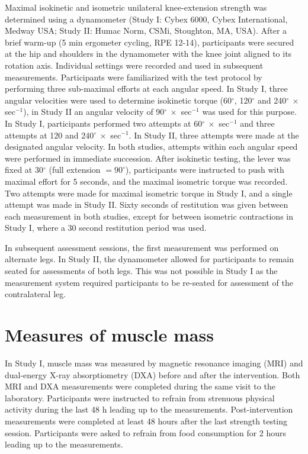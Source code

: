 \documentclass[twoside,10pt]{gihclass} %
\begin{document}
Maximal isokinetic and isometric unilateral knee-extension strength was determined using a dynamometer (Study I: Cybex 6000, Cybex International, Medway USA; Study II: Humac Norm, CSMi, Stoughton, MA, USA).
After a brief warm-up (5 min ergometer cycling, RPE 12-14), participants were secured at the hip and shoulders in the dynamometer with the knee joint aligned to its rotation axis.
Individual settings were recorded and used in subsequent measurements.
Participants were familiarized with the test protocol by performing three sub-maximal efforts at each angular speed.
In Study I, three angular velocities were used to determine isokinetic torque (60\(^{\circ}\), 120\(^{\circ}\) and 240\(^{\circ} ~\times\) sec\(^{-1}\)), in Study II an angular velocity of 90\(^{\circ} ~\times\) sec\(^{-1}\) was used for this purpose.
In Study I, participants performed two attempts at 60\(^{\circ} ~\times\) sec\(^{-1}\) and three attempts at 120 and 240\(^{\circ}~\times\) sec\(^{-1}\).
In Study II, three attempts were made at the designated angular velocity.
In both studies, attempts within each angular speed were performed in immediate succession.
After isokinetic testing, the lever was fixed at 30\(^{\circ}\) (full extension \(=90^{\circ}\)), participants were instructed to push with maximal effort for 5 seconds, and the maximal isometric torque was recorded.
Two attempts were made for maximal isometric torque in Study I, and a single attempt was made in Study II.
Sixty seconds of restitution was given between each measurement in both studies, except for between isometric contractions in Study I, where a 30 second restitution period was used.

In subsequent assessment sessions, the first measurement was performed on alternate legs.
In Study II, the dynamometer allowed for participants to remain seated for assessments of both legs. This was not possible in Study I as the measurement system required participants to be re-seated for assessment of the contralateral leg.

\hypertarget{measures-of-muscle-mass}{%
\section{Measures of muscle mass}\label{measures-of-muscle-mass}}

In Study I, muscle mass was measured by magnetic resonance imaging (MRI) and dual-energy X-ray absorptiometry (DXA) before and after the intervention. Both MRI and DXA measurements were completed during the same visit to the laboratory. Participants were instructed to refrain from strenuous physical activity during the last 48 h leading up to the measurements. Post-intervention measurements were completed at least 48 hours after the last strength testing session. Participants were asked to refrain from food consumption for 2 hours leading up to the measurements.
\end{document}
